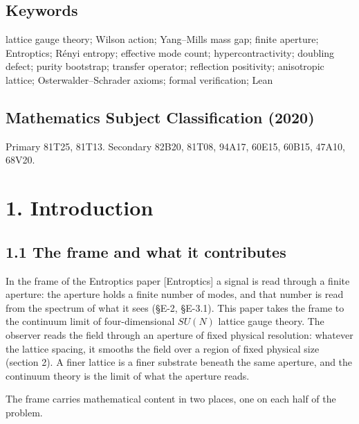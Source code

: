 \documentclass[10pt,letterpaper,twocolumn]{article}
\begin{document}
\subsection{Keywords}\label{keywords}

lattice gauge theory; Wilson action; Yang--Mills mass gap; finite aperture; Entroptics; Rényi entropy; effective mode count; hypercontractivity; doubling defect; purity bootstrap; transfer operator; reflection positivity; anisotropic lattice; Osterwalder--Schrader axioms; formal verification; Lean

\subsection{Mathematics Subject Classification (2020)}\label{mathematics-subject-classification-2020}

Primary 81T25, 81T13. Secondary 82B20, 81T08, 94A17, 60E15, 60B15, 47A10, 68V20.

\section{1. Introduction}\label{1-introduction}

\subsection{1.1 The frame and what it contributes}\label{11-the-frame-and-what-it-contributes}

In the frame of the Entroptics paper {[}Entroptics{]} a signal is read through a finite aperture: the aperture holds a finite number of modes, and that number is read from the spectrum of what it sees (§E-2, §E-3.1). This paper takes the frame to the continuum limit of four-dimensional \(SU(N)\) lattice gauge theory. The observer reads the field through an aperture of fixed physical resolution: whatever the lattice spacing, it smooths the field over a region of fixed physical size (section 2). A finer lattice is a finer substrate beneath the same aperture, and the continuum theory is the limit of what the aperture reads.

The frame carries mathematical content in two places, one on each half of the problem.
\end{document}
